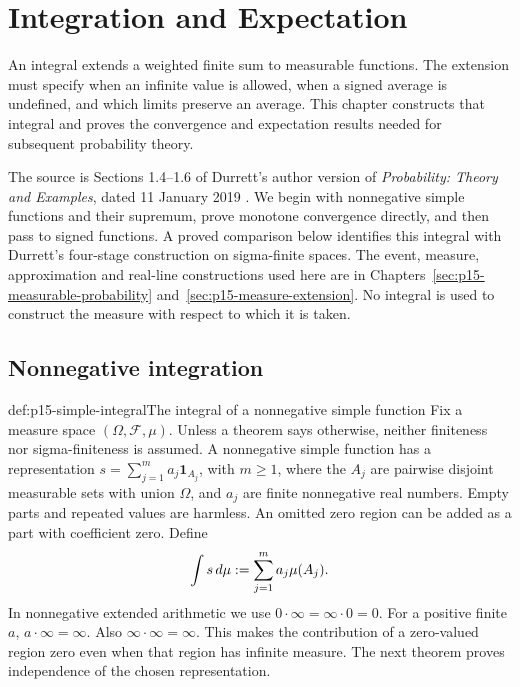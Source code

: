 \chapter{Integration and Expectation}
\label{sec:p15-integration-expectation}

An integral extends a weighted finite sum to measurable functions. The
extension must specify when an infinite value is allowed, when a signed
average is undefined, and which limits preserve an average. This chapter
constructs that integral and proves the convergence and expectation results
needed for subsequent probability theory.

The source is Sections 1.4--1.6 of Durrett's author version of
\emph{Probability: Theory and Examples}, dated 11 January 2019
\cite[pp.~18--37]{DurrettPTEAuthor2019}. We begin with nonnegative simple
functions and their supremum, prove monotone convergence directly, and
then pass to signed functions. A proved comparison below identifies this
integral with Durrett's four-stage construction on sigma-finite spaces.
The event, measure, approximation and real-line constructions used here
are in Chapters~\ref{sec:p15-measurable-probability}
and~\ref{sec:p15-measure-extension}. No integral is used to construct
the measure with respect to which it is taken.

\section{Nonnegative integration}
\label{sec:p15-nonnegative-integral}

\begin{hbdefinition}{def:p15-simple-integral}{The integral of a nonnegative simple function}
Fix a measure space \((\Omega,\mathcal F,\mu)\). Unless a theorem
says otherwise, neither finiteness nor sigma-finiteness is assumed.
A nonnegative simple function has a representation
\(s=\sum_{j=1}^m a_j\mathbf1_{A_j}\), with \(m\geq1\), where the
\(A_j\) are pairwise disjoint measurable sets with union \(\Omega\),
and \(a_j\) are finite
nonnegative real numbers. Empty parts and repeated values are harmless.
An omitted zero region can be added as a part with coefficient zero.
Define
\[
 \int s\,d\mu\mathrel{:=}\sum_{j=1}^m a_j\mu(A_j).
\]
In nonnegative extended arithmetic we use \(0\cdot\infty=\infty\cdot0=0\).
For a positive finite \(a\), \(a\cdot\infty=\infty\).
Also \(\infty\cdot\infty=\infty\).
This makes the contribution of a zero-valued region zero even when that
region has infinite measure. The next theorem proves independence of
the chosen representation.
\end{hbdefinition}

